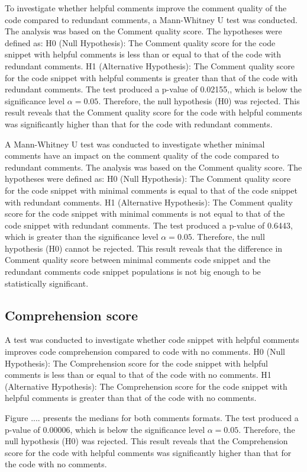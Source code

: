 To investigate whether helpful comments improve the comment quality of the code compared to redundant comments, a Mann-Whitney U test was conducted.  The analysis was based on the Comment quality score. The hypotheses were defined as: H0 (Null Hypothesis): The Comment quality score for the code snippet with helpful comments is less than or equal to that of the code with redundant comments.  H1 (Alternative Hypothesis): The Comment quality score for the code snippet with helpful comments is greater than that of the code with redundant comments. The test produced a p-value of 0.02155,, which is below the significance level $\alpha = 0.05$. Therefore, the null hypothesis (H0) was rejected. This result reveals that the Comment quality score for the code with helpful comments was significantly higher than that for the code with redundant comments. 



A Mann-Whitney U test was conducted to investigate whether minimal comments have an impact on the comment quality of the code compared to redundant comments. The analysis was based on the Comment quality score. The hypotheses were defined as: H0 (Null Hypothesis): The Comment quality score for the code snippet with minimal comments is equal to that of the code snippet with redundant comments. H1 (Alternative Hypothesis): The Comment quality score for the code snippet with minimal comments is not equal to that of the code snippet with redundant comments.  The test produced a p-value of 0.6443, which is greater than the significance level $\alpha = 0.05$. Therefore, the null hypothesis (H0) cannot be rejected. This result reveals that the difference in Comment quality score between minimal comments code snippet and the redundant comments code snippet populations is not big enough to be statistically significant.


\subsection{Comprehension score}
A test was conducted to investigate whether code snippet with helpful comments improves code comprehension compared to code with no comments. H0 (Null Hypothesis): The Comprehension score for the code snippet with helpful comments is less than or equal to that of the code with no comments.  H1 (Alternative Hypothesis): The Comprehension score for the code snippet with helpful comments is greater than that of the code with no comments.


Figure .... presents the medians for both comments formats.
The test produced a p-value of 0.00006, which is below the significance level $\alpha = 0.05$. Therefore, the null hypothesis (H0) was rejected.  This result reveals that the Comprehension score for the code with helpful comments was significantly higher than that for the code with no comments. 


